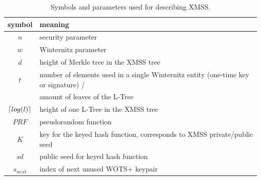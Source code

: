 \begin{table}
\begin{center}
\begin{tabular}{c l} 
 \hline
 symbol & meaning  \\ 
 \hline
 $n$ & security parameter \\ %
 $w$ & Winternitz parameter  \\ 
 $d$ & height of Merkle tree in the XMSS tree  \\ 
 $t$ & number of elements used in a single Winternitz entity (one-time key or signature) / \\ 
     & amount of leaves of the L-Tree \\ 
 $\lceil log(l)\rceil$ & height of one L-Tree in the XMSS tree \\
 $PRF$ & pseudorandom function \\
 $K$ & key for the keyed hash function, corresponds to XMSS private/public seed \\
 $sd$ & public seed for keyed hash function \\
 $s_{next}$ & index of next unused WOTS+ keypair \\
 \hline
\end{tabular}
\caption{Symbols and parameters used for describing XMSS.}
\label{table:xmms_param}
\end{center}
\end{table}


